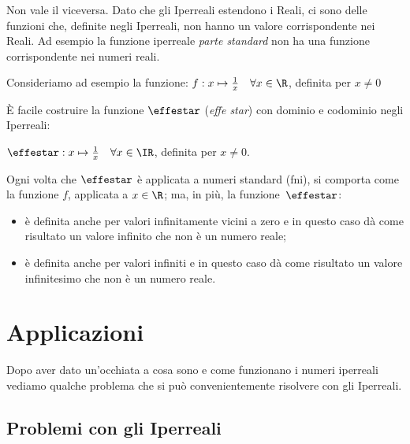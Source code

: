 \begin{osservazione}
 Non vale il viceversa. Dato che gli Iperreali estendono i Reali, ci sono 
delle funzioni che, definite negli Iperreali, non hanno un valore 
corrispondente nei Reali. Ad esempio la funzione iperreale \emph{parte 
standard} non ha una funzione corrispondente nei numeri reali.

\begin{esempio}
 Consideriamo ad esempio la funzione: 
$f: x \mapsto \frac{1}{x} \quad \forall x \in \R$, definita per $x\ne 0$

È facile costruire la funzione $\effestar$ (\emph{effe star}) con dominio e 
codominio negli Iperreali:

$\effestar: x \mapsto \frac{1}{x} \quad \forall x \in \IR$, definita per 
$x\ne 0$.

Ogni volta che $\effestar$ è applicata a numeri standard (fni), si comporta 
come
la funzione $f$, applicata a $x \in \R$; ma, in più, la 
funzione~$\effestar$:
\begin{itemize} [noitemsep]
 \item 
è definita anche per valori infinitamente vicini a zero e 
in questo caso dà come risultato un valore infinito che non è un numero 
reale;
 \item 
è definita anche per valori infiniti e
in questo caso dà come risultato un valore infinitesimo che non è un numero 
reale. 
\end{itemize}
\end{esempio}
\end{osservazione}

\section{Applicazioni}
\label{sec:insnum_applicazioni}

Dopo aver dato un'occhiata a cosa sono e come funzionano i numeri iperreali 
vediamo qualche problema che si può convenientemente risolvere con gli 
Iperreali.

\subsection{Problemi con gli Iperreali}
\label{subsec:insnum_problemi}

